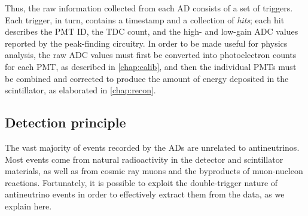 \documentclass[../thesis.tex]{subfiles}
\begin{document}
Thus, the raw information collected from each AD consists of a set of triggers. Each trigger, in turn, contains a timestamp and a collection of \emph{hits}; each hit describes the PMT ID, the TDC count, and the high- and low-gain ADC values reported by the peak-finding circuitry. In order to be made useful for physics analysis, the raw ADC values must first be converted into photoelectron counts for each PMT, as described in \autoref{chap:calib}, and then the individual PMTs must be combined and corrected to produce the amount of energy deposited in the scintillator, as elaborated in \autoref{chap:recon}.

\subsection{Detection principle}
\label{sec:expDetPrinc}

The vast majority of events recorded by the ADs are unrelated to antineutrinos. Most events come from natural radioactivity in the detector and scintillator materials, as well as from cosmic ray muons and the byproducts of muon-nucleon reactions. Fortunately, it is possible to exploit the double-trigger nature of antineutrino events in order to effectively extract them from the data, as we explain here.
\end{document}
